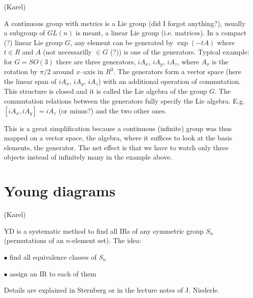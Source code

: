 (Karel)

A continuous group with metrics is a Lie group (did I forgot anything?),
usually a subgroup of $GL(n)$ is meant, a linear Lie group (i.e. matrices). In
a compact (?) linear Lie group $G$, any element can be generated by
$\exp(-tA)$ where $t\in R$ and $A$ (not necessarilly $\in G$ (?)) is one of
the generators. Typical example: for $G=SO(3)$ there are three generators,
$iA_x$, $iA_y$, $iA_z$, where $A_x$ is the rotation by $\pi/2$ around
$x$--axis in $R^3$. The generators form a vector space (here the linear span
of $iA_x$, $iA_y$, $iA_z$) with an additional operation of
commutation. This structure is closed and it is called the Lie algebra of the
group $G$. The commutation relations between the generators fully specify the
Lie algebra. E.g. $[iA_x,iA_y]=iA_z$ (or minus?) and the two other ones.

This is a great simplification because a continuous (infinite) group was thus
mapped on a vector space, the algebra, where it suffices to look at the basis
elements, the generator. The net effect is that we have to watch only three
objects instead of infinitely many in the example above.



\section{Young diagrams}

(Karel)

YD is a systematic method to find all IRs of any symmetric group $S_n$
(permutations of an $n$-element set). The idea:

$\bullet$ find all equivalence classes of $S_n$

$\bullet$ assign an IR to each of them

\noindent
Details are explained in Sternberg or in the lecture notes of J. Niederle. 





